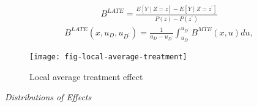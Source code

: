 \begin{frame}
	\begin{align*}
		B^{LATE} = \frac{E[Y\mid Z = z] - E[Y \mid Z = z^\prime]}{P(z) - P(z^\prime)}
	\end{align*}
	\begin{align*}
		B^{LATE}(x, u_D, u_{D^\prime}) = \frac{1}{u_D - u_{D^\prime}} \int_{u_D}^{u_{D^\prime}} B^{MTE}(x, u) du,
	\end{align*}
\end{frame}
\begin{frame}
	\begin{figure}[htp]\centering
		\caption{Local average treatment effect}\scalebox{0.35}
		{\texttt{[image: fig-local-average-treatment]}}
	\end{figure}
\end{frame}

\begin{frame}\begin{center}
		\LARGE\textit{Distributions of Effects}
\end{center}\end{frame}



